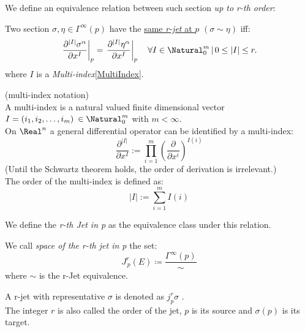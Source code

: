 \documentclass[Main]{subfiles}
\begin{document}
			We define an equivalence relation between such section \emph{up to r-th order}:
			\begin{definition}
				Two section $\sigma, \eta \in \Gamma^\infty(p)$ have the \underline{same \emph{r-jet} at $p$} $(\sigma \sim \eta)$ iff:
				\begin{displaymath}
					\left.\frac{\partial^{|I|} \sigma^{\alpha}}{\partial x^{I}}\right|_{p} = \left.\frac{\partial^{|I|} \eta^{\alpha}}{\partial x^{I}}\right|_{p} \quad \forall I\in \Natural^m_0 \, \vert \, 0 \leq |I| \leq r.
				\end{displaymath}	
				where $I$ is a \emph{Multi-index}\ref{MultiIndex}.	
		\end{definition}
		\begin{remark}\label{MultiIndex}
			(multi-index notation)
			\\
			A multi-index is a natural valued finite dimensional vector  $I=(i_1, i_2, \ldots, i_m)\: \in \Natural^m_0$ with $m<\infty$.
			\\
			On $\Real^n$ a general differential operator can be identified by a multi-index:
			\begin{displaymath}
				\frac{\partial^{|I|}}{\partial x^{I}} := \prod_{i=1}^{m} \left( \frac{\partial}{\partial x^{i}} \right)^{I(i)}
			\end{displaymath}
			(Until the Schwartz theorem holds, the order of derivation is irrelevant.)
			\\
			The order of the multi-index is defined as:
			\begin{displaymath}
				|I| := \sum_{i=1}^{m} I(i)
			\end{displaymath}
		\end{remark}
	
		We define the \emph{r-th Jet in p} as the equivalence class under this relation.
		\begin{definition}
			We call \emph{space of the r-th jet in p} the set:
			\begin{displaymath}
				J^r_{\,p}(E) \coloneqq \frac{\Gamma^\infty(p)}{\sim}
			\end{displaymath}
			where $\sim$ is the r-Jet equivalence.
		\end{definition}
		\begin{notationfix} 
			A r-jet with representative $\sigma$ is denoted as $j^r_p\sigma$ . 
			\\
			The integer $r$ is also called the order of the jet, $p$ is its source and $\sigma(p)$ is its target.
		\end{notationfix}
	
\end{document}
